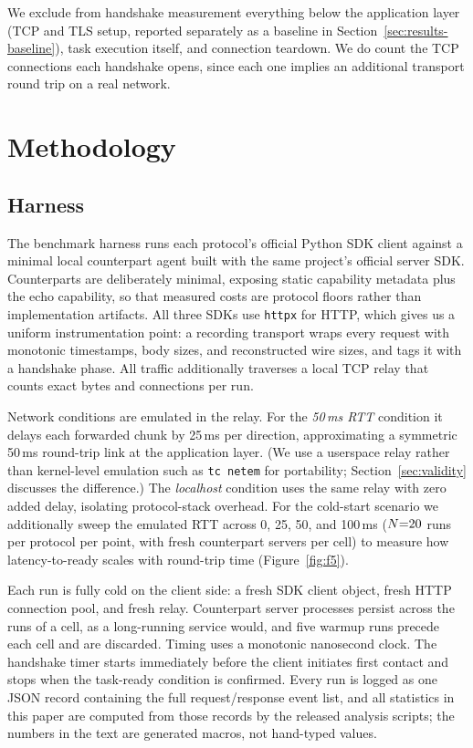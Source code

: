 \documentclass[10pt]{article}
\begin{document}
We exclude from handshake measurement everything below the application
layer (TCP and TLS setup, reported separately as a baseline in
 Section~\ref{sec:results-baseline}), task execution itself, and
connection teardown. We do count the TCP connections each handshake
opens, since each one implies an additional transport round trip on a
real network.

\section{Methodology}
\label{sec:method}

\subsection{Harness}

The benchmark harness runs each protocol's official Python SDK client
against a minimal local counterpart agent built with the same project's
official server SDK. Counterparts are deliberately minimal, exposing
static capability metadata plus the echo capability, so that measured
costs are protocol floors rather than implementation artifacts. All three
SDKs use \texttt{httpx} for HTTP, which gives us a uniform
instrumentation point: a recording transport wraps every request with
monotonic timestamps, body sizes, and reconstructed wire sizes, and tags
it with a handshake phase. All traffic additionally traverses a local TCP
relay that counts exact bytes and connections per run.

Network conditions are emulated in the relay. For the \emph{50\,ms RTT}
condition it delays each forwarded chunk by 25\,ms per direction,
approximating a symmetric 50\,ms round-trip link at the application
layer. (We use a userspace relay rather than kernel-level emulation such
as \texttt{tc netem} for portability; Section~\ref{sec:validity}
discusses the difference.) The \emph{localhost} condition uses the same
relay with zero added delay, isolating protocol-stack overhead. For the
cold-start scenario we additionally sweep the emulated RTT across 0, 25,
50, and 100\,ms ($N{=}20{}$ runs per protocol per point, with fresh
counterpart servers per cell) to measure how latency-to-ready scales with
round-trip time (Figure~\ref{fig:f5}).

Each run is fully cold on the client side: a fresh SDK client object,
fresh HTTP connection pool, and fresh relay. Counterpart server processes
persist across the runs of a cell, as a long-running service would, and
five warmup runs precede each cell and are discarded. Timing uses a
monotonic nanosecond clock. The handshake timer starts immediately before
the client initiates first contact and stops when the task-ready
condition is confirmed. Every run is logged as one JSON record containing
the full request/response event list, and all statistics in this paper
are computed from those records by the released analysis scripts; the
numbers in the text are generated macros, not hand-typed values.
\end{document}

